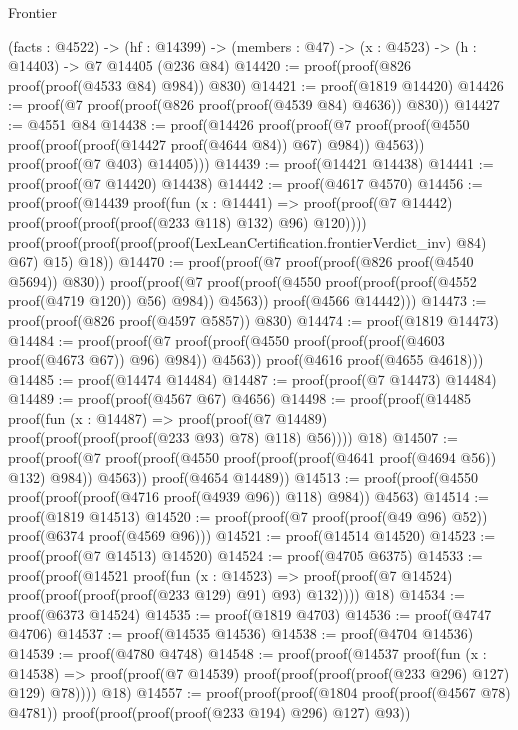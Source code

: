 \begin{lexlean}{Frontier}
\begin{coremodule}
  (facts : @4522) ->
  (hf : @14399) -> (members : @47) -> (x : @4523) -> (h : @14403) -> @7 @14405 (@236 @84)
@14420 := proof(proof(@826 proof(proof(@4533 @84) @984)) @830)
@14421 := proof(@1819 @14420)
@14426 := proof(@7 proof(proof(@826 proof(proof(@4539 @84) @4636)) @830))
@14427 := @4551 @84
@14438 := proof(@14426
      proof(proof(@7
            proof(proof(@4550 proof(proof(proof(@14427 proof(@4644 @84)) @67) @984)) @4563))
          proof(proof(@7 @403) @14405)))
@14439 := proof(@14421 @14438)
@14441 := proof(proof(@7 @14420) @14438)
@14442 := proof(@4617 @4570)
@14456 := proof(proof(@14439
        proof(fun (x : @14441) =>
          proof(proof(@7 @14442) proof(proof(proof(proof(@233 @118) @132) @96) @120))))
      proof(proof(proof(proof(proof(LexLeanCertification.frontierVerdict_inv) @84) @67) @15) @18))
@14470 := proof(proof(@7 proof(proof(@826 proof(@4540 @5694)) @830))
      proof(proof(@7
            proof(proof(@4550 proof(proof(proof(@4552 proof(@4719 @120)) @56) @984)) @4563))
          proof(@4566 @14442)))
@14473 := proof(proof(@826 proof(@4597 @5857)) @830)
@14474 := proof(@1819 @14473)
@14484 := proof(proof(@7
        proof(proof(@4550 proof(proof(proof(@4603 proof(@4673 @67)) @96) @984)) @4563))
      proof(@4616 proof(@4655 @4618)))
@14485 := proof(@14474 @14484)
@14487 := proof(proof(@7 @14473) @14484)
@14489 := proof(proof(@4567 @67) @4656)
@14498 := proof(proof(@14485
        proof(fun (x : @14487) =>
          proof(proof(@7 @14489) proof(proof(proof(proof(@233 @93) @78) @118) @56))))
      @18)
@14507 := proof(proof(@7
        proof(proof(@4550 proof(proof(proof(@4641 proof(@4694 @56)) @132) @984)) @4563))
      proof(@4654 @14489))
@14513 := proof(proof(@4550 proof(proof(proof(@4716 proof(@4939 @96)) @118) @984)) @4563)
@14514 := proof(@1819 @14513)
@14520 := proof(proof(@7 proof(proof(@49 @96) @52)) proof(@6374 proof(@4569 @96)))
@14521 := proof(@14514 @14520)
@14523 := proof(proof(@7 @14513) @14520)
@14524 := proof(@4705 @6375)
@14533 := proof(proof(@14521
        proof(fun (x : @14523) =>
          proof(proof(@7 @14524) proof(proof(proof(proof(@233 @129) @91) @93) @132))))
      @18)
@14534 := proof(@6373 @14524)
@14535 := proof(@1819 @4703)
@14536 := proof(@4747 @4706)
@14537 := proof(@14535 @14536)
@14538 := proof(@4704 @14536)
@14539 := proof(@4780 @4748)
@14548 := proof(proof(@14537
        proof(fun (x : @14538) =>
          proof(proof(@7 @14539) proof(proof(proof(proof(@233 @296) @127) @129) @78))))
      @18)
@14557 := proof(proof(proof(@1804 proof(proof(@4567 @78) @4781))
        proof(proof(proof(proof(@233 @194) @296) @127) @93))

\end{coremodule}
\end{lexlean}
